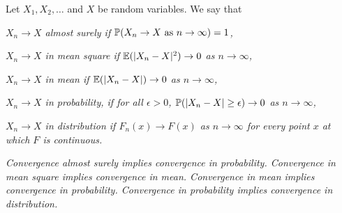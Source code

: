 \begin{definition}
Let $X_1,X_2,\ldots$ and $X$ be random variables. We say that

\ben
\it %
$X_n\to X$ \emph{almost surely} if $\mathbb{P}(X_n\to X \text{ as } n\to\infty) = 1$,

\it %
$X_n\to X$ \emph{in mean square} if $\mathbb{E}(|X_n - X|^2) \to 0$ as $n\to\infty$,

\it %
$X_n\to X$ \emph{in mean} if $\mathbb{E}(|X_n - X|) \to 0$ as $n\to\infty$,

\it %
$X_n\to X$ \emph{in probability}, if for all $\epsilon > 0$, $\mathbb{P}(|X_n-X|\geq\epsilon) \to 0$ as $n\to\infty$,

%
\it %
$X_n\to X$ \emph{in distribution} if $F_n(x)\to F(x)$ as $n\to\infty$ for every point $x$ at which $F$ is continuous.
\een
\end{definition}

\begin{theorem}
\ben
\it Convergence almost surely implies convergence in probability.
\it Convergence in mean square implies convergence in mean.
\it Convergence in mean implies convergence in probability.
\it Convergence in probability implies convergence in distribution.
\een
\end{theorem}
\vspace*{-2ex}
\proofomitted


